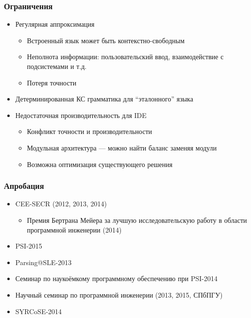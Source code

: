 \documentclass{beamer}
\begin{document}
\begin{frame}[t]
    \transwipe[direction=90]
    \frametitle{Ограничения}
    \begin{itemize}
        \item Регулярная аппроксимация
        \begin{itemize}
          \item Встроенный язык может быть контекстно-свободным
          \item Неполнота информации: пользовательский ввод, взаимодействие с подсистемами и т.д.
          \item Потеря точности
        \end{itemize}
        \item Детерминированная КС грамматика для ``эталонного'' языка 
        \item Недостаточная производительность для IDE
        \begin{itemize}
          \item Конфликт точности и производительности
          \item Модульная архитектура --- можно найти баланс заменяя модули
          \item Возможна оптимизация существующего решения
        \end{itemize}
    \end{itemize}
\end{frame}

\begin{frame}
    \transwipe[direction=90]
    \frametitle{Апробация}
  \begin{itemize}
          \item CEE-SECR (2012, 2013, 2014)
          \begin{itemize}
              \item Премия Бертрана Мейера за лучшую исследовательскую работу в области программной 
инженерии (2014)
          \end{itemize}
          \item PSI-2015 
          \item Parsing@SLE-2013
          \item Семинар по наукоёмкому программному обеспечению при PSI-2014
          \item Научный семинар по программной инженерии (2013, 2015, СПбПГУ)
          \item SYRCoSE-2014          
  \end{itemize} 
\end{frame}
\end{document}
